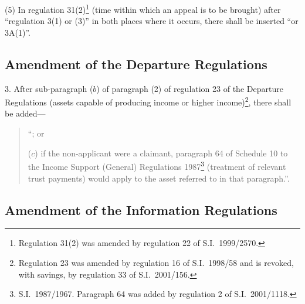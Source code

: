 \documentclass[12pt,a4paper]{article}
\begin{document}
(5) In regulation 31(2)\footnote{Regulation 31(2) was amended by regulation 22 of S.I.\ 1999/2570.} (time within which an appeal is to be brought) after “regulation 3(1) or (3)” in both places where it occurs, there shall be inserted “or 3A(1)”.

\subsection[3. Amendment of the Departure Regulations]{Amendment of the Departure Regulations}

3.  After sub-paragraph ($b$)  of paragraph (2) of regulation 23 of the Departure Regulations (assets capable of producing income or higher income)\footnote{Regulation 23 was amended by regulation 16 of S.I.\ 1998/58 and is revoked, with savings, by regulation 33 of S.I.\ 2001/156.}, there shall be added—
\begin{quotation}
    “; or

    ($c$) 
    if the non-applicant were a claimant, paragraph 64 of Schedule 10 to the Income Support (General) Regulations 1987\footnote{S.I.\ 1987/1967. Paragraph 64 was added by regulation 2 of S.I.\ 2001/1118.} (treatment of relevant trust payments) would apply to the asset referred to in that paragraph.”. 
\end{quotation}

\subsection[4. Amendment of the Information Regulations]{Amendment of the Information Regulations}
\end{document}
